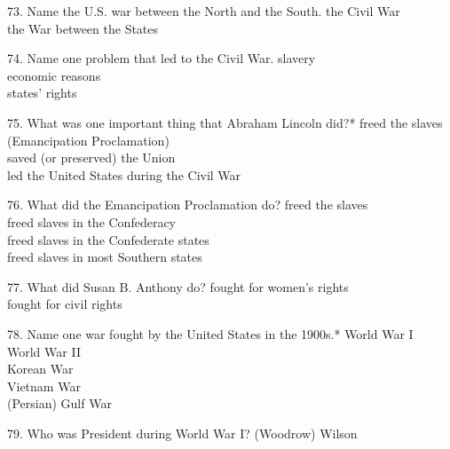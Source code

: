 \documentclass[avery5371,frame]{flashcards}
\begin{document}
        \begin{flashcard}{73. Name the U.S. war between the North and the South.}
        {the Civil War\\the War between the States}
        \end{flashcard}
        \begin{flashcard}{74. Name one problem that led to the Civil War.}
        {slavery\\economic reasons\\states’ rights}
        \end{flashcard}
        \begin{flashcard}{75. What was one important thing that Abraham Lincoln did?*}
        {freed the slaves (Emancipation Proclamation)\\saved (or preserved) the Union\\led the United States during the Civil War}
        \end{flashcard}
        \begin{flashcard}{76. What did the Emancipation Proclamation do?}
        {freed the slaves\\freed slaves in the Confederacy\\freed slaves in the Confederate states\\freed slaves in most Southern states}
        \end{flashcard}
        \begin{flashcard}{77. What did Susan B. Anthony do?}
        {fought for women’s rights\\fought for civil rights}
        \end{flashcard}
        \begin{flashcard}{78. Name one war fought by the United States in the 1900s.*}
        {World War I\\World War II\\Korean War\\Vietnam War\\(Persian) Gulf War}
        \end{flashcard}
        \begin{flashcard}{79. Who was President during World War I?}
        {(Woodrow) Wilson}
        \end{flashcard}
\end{document}
